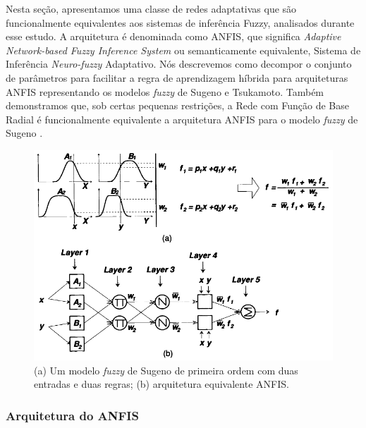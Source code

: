 Nesta seção, apresentamos uma classe de redes adaptativas que são funcionalmente equivalentes aos sistemas de inferência Fuzzy, analisados durante esse estudo. A arquitetura é denominada como ANFIS, que significa \textit{Adaptive Network-based Fuzzy Inference System} ou semanticamente equivalente, Sistema de Inferência \textit{Neuro-fuzzy} Adaptativo. Nós descrevemos como decompor o conjunto de parâmetros para facilitar a regra de aprendizagem híbrida para arquiteturas ANFIS representando os modelos \textit{fuzzy} de Sugeno e Tsukamoto. Também demonstramos que, sob certas pequenas restrições, a Rede com Função de Base Radial é funcionalmente equivalente a arquitetura ANFIS para o modelo \textit{fuzzy} de Sugeno \cite{jang1997neuro}.

\begin{figure}[h]
	\centering
	\includegraphics[width=.7\textwidth]{image/anfis.png}
	\caption{(a) Um modelo \textit{fuzzy} de Sugeno de primeira ordem com duas entradas e duas regras; (b) arquitetura equivalente ANFIS.}
	\label{fig:anfis}
\end{figure}

\subsubsection{Arquitetura do ANFIS}

